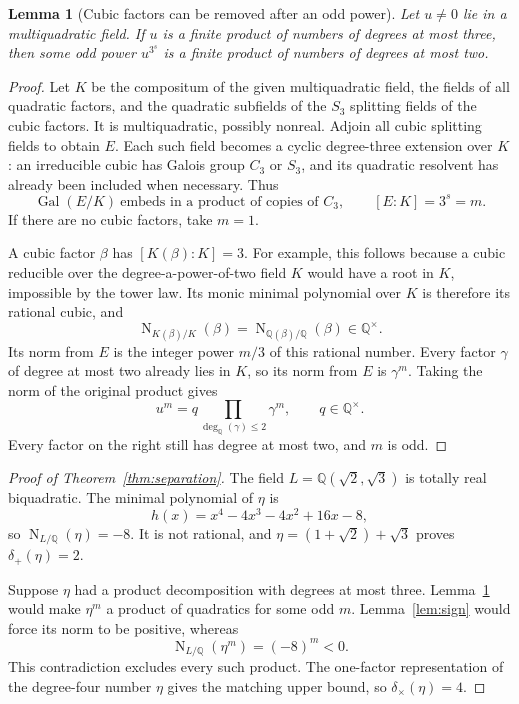 \documentclass[11pt,letterpaper]{article}
\newtheorem{lemma}[theorem]{Lemma}
\theoremstyle{definition}
\newcommand{\Q}{\mathbb Q}
\newcommand{\Gal}{\operatorname{Gal}}
\newcommand{\Nm}{\operatorname{N}}
\newcommand{\dq}{\deg_{\Q}}
\newcommand{\dplus}{\delta_{+}}
\newcommand{\dtimes}{\delta_{\times}}
\begin{document}
\begin{lemma}[Cubic factors can be removed after an odd power]\label{lem:cubicnorm}
Let $u\ne0$ lie in a multiquadratic field. If $u$ is a finite product of numbers of degrees at most three, then some odd power $u^{3^s}$ is a finite product of numbers of degrees at most two.
\end{lemma}
\begin{proof}
Let $K$ be the compositum of the given multiquadratic field, the fields of all quadratic factors, and the quadratic subfields of the $S_3$ splitting fields of the cubic factors. It is multiquadratic, possibly nonreal. Adjoin all cubic splitting fields to obtain $E$. Each such field becomes a cyclic degree-three extension over $K$: an irreducible cubic has Galois group $C_3$ or $S_3$, and its quadratic resolvent has already been included when necessary. Thus
\[
 \Gal(E/K)\ \text{embeds in a product of copies of }C_3,
 \qquad [E:K]=3^s=m.
\]
If there are no cubic factors, take $m=1$.

A cubic factor $\beta$ has $[K(\beta):K]=3$. For example, this follows because a cubic reducible over the degree-a-power-of-two field $K$ would have a root in $K$, impossible by the tower law. Its monic minimal polynomial over $K$ is therefore its rational cubic, and
\[
 \Nm_{K(\beta)/K}(\beta)=\Nm_{\Q(\beta)/\Q}(\beta)\in\Q^{\times}.
\]
Its norm from $E$ is the integer power $m/3$ of this rational number. Every factor $\gamma$ of degree at most two already lies in $K$, so its norm from $E$ is $\gamma^m$. Taking the norm of the original product gives
\[
 u^m=q\prod_{\dq(\gamma)\le2}\gamma^m,
 \qquad q\in\Q^{\times}.
\]
Every factor on the right still has degree at most two, and $m$ is odd.
\end{proof}

\begin{proof}[Proof of Theorem~\ref{thm:separation}]
The field $L=\Q(\sqrt2,\sqrt3)$ is totally real biquadratic. The minimal polynomial of $\eta$ is
\[
 h(x)=x^4-4x^3-4x^2+16x-8,
\]
so $\Nm_{L/\Q}(\eta)=-8$. It is not rational, and
$\eta=(1+\sqrt2)+\sqrt3$ proves $\dplus(\eta)=2$.

Suppose $\eta$ had a product decomposition with degrees at most three. Lemma~\ref{lem:cubicnorm} would make $\eta^m$ a product of quadratics for some odd $m$. Lemma~\ref{lem:sign} would force its norm to be positive, whereas
\[
 \Nm_{L/\Q}(\eta^m)=(-8)^m<0.
\]
This contradiction excludes every such product. The one-factor representation of the degree-four number $\eta$ gives the matching upper bound, so $\dtimes(\eta)=4$.
\end{proof}
\end{document}
